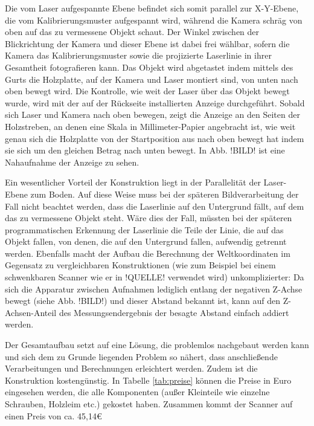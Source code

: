 \bigbreak
Die vom Laser aufgespannte Ebene befindet sich somit parallel zur X-Y-Ebene, die vom Kalibrierungsmuster aufgespannt wird, während die Kamera schräg von oben auf das zu vermessene Objekt schaut. Der Winkel zwischen der Blickrichtung der Kamera und dieser Ebene ist dabei frei wählbar, sofern die Kamera das Kalibrierungsmuster sowie die projizierte Laserlinie in ihrer Gesamtheit fotografieren kann.  Das Objekt wird abgetastet indem mittels des Gurts die Holzplatte, auf der Kamera und Laser montiert sind, von unten nach oben bewegt wird. Die Kontrolle, wie weit der Laser über das Objekt bewegt wurde, wird mit der auf der Rückseite installierten Anzeige durchgeführt. Sobald sich Laser und Kamera nach oben bewegen, zeigt die Anzeige an den Seiten der Holzstreben, an denen eine Skala in Millimeter-Papier angebracht ist, wie weit genau sich die Holzplatte von der Startposition aus nach oben bewegt hat indem sie sich um den gleichen Betrag nach unten bewegt. In Abb. !BILD! ist eine Nahaufnahme der Anzeige zu sehen. 
\bigbreak

Ein wesentlicher Vorteil der Konstruktion liegt in der Parallelität der Laser-Ebene zum Boden. Auf diese Weise muss bei der späteren Bildverarbeitung der Fall nicht beachtet werden, dass die Laserlinie auf den Untergrund fällt, auf dem das zu vermessene Objekt steht. Wäre dies der Fall, müssten bei der späteren programmatischen Erkennung der Laserlinie die Teile der Linie, die auf das Objekt fallen, von denen, die auf den Untergrund fallen, aufwendig getrennt werden. Ebenfalls macht der Aufbau die Berechnung der Weltkoordinaten im Gegensatz zu vergleichbaren Konstruktionen (wie zum Beispiel bei einem schwenkbaren Scanner wie er in !QUELLE! verwendet wird) unkomplizierter: Da sich die Apparatur zwischen Aufnahmen lediglich entlang der negativen Z-Achse bewegt (siehe Abb. !BILD!) und dieser Abstand bekannt ist, kann auf den Z-Achsen-Anteil des Messungsendergebnis der besagte Abstand einfach addiert werden.
\bigbreak

Der Gesamtaufbau setzt auf eine Lösung, die problemlos nachgebaut werden kann und sich dem zu Grunde liegenden Problem so nähert, dass anschließende Verarbeitungen und Berechnungen erleichtert werden. Zudem ist die Konstruktion kostengünstig. In Tabelle \ref{tab:preise} können die Preise in Euro eingesehen werden, die alle Komponenten (außer Kleinteile wie einzelne Schrauben, Holzleim etc.) gekostet haben. Zusammen kommt der Scanner auf einen Preis von ca. 45,14\euro

